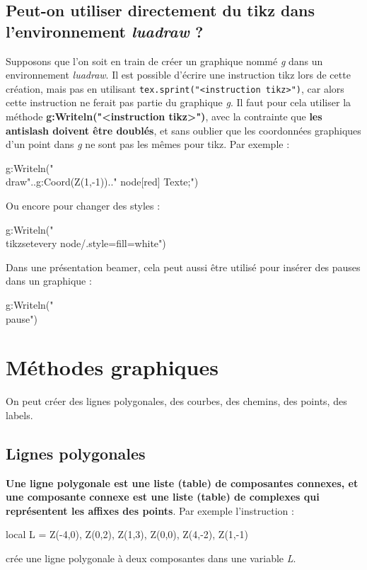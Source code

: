 \documentclass[%
10pt,%
a4paper,%
french,%
]%
{article}%
\begin{document}
\subsection{Peut-on utiliser directement du tikz dans l'environnement \emph{luadraw} ?}

Supposons que l'on soit en train de créer un graphique nommé \emph{g} dans un environnement \emph{luadraw}. Il est possible d'écrire une instruction tikz lors de cette création, mais pas en utilisant \verb|tex.sprint("<instruction tikz>")|, car alors cette instruction ne ferait pas partie du graphique \emph{g}. Il faut pour cela utiliser la méthode \textbf{g:Writeln("<instruction tikz>")}, avec la contrainte que \textbf{les antislash doivent être doublés}, et sans oublier que les coordonnées graphiques d'un point dans \emph{g} ne sont pas les mêmes pour tikz. Par exemple : 
\begin{Luacode}
g:Writeln("\\draw"..g:Coord(Z(1,-1)).." node[red] {Texte};")
\end{Luacode}

Ou encore pour changer des styles :
\begin{Luacode}
g:Writeln("\\tikzset{every node/.style={fill=white}}")
\end{Luacode}

Dans une présentation beamer, cela peut aussi être utilisé pour insérer des pauses dans un graphique :
\begin{Luacode}
g:Writeln("\\pause")
\end{Luacode}  

\section{Méthodes graphiques}\label{objets-graphiques}

On peut créer des lignes polygonales, des courbes, des chemins, des points, des labels.


\subsection{Lignes polygonales}\label{lignes-polygonales}

\textbf{Une ligne polygonale est une liste (table) de composantes connexes, et une composante connexe est une liste (table) de complexes qui représentent les affixes des points}. Par exemple l'instruction :
\begin{Luacode}
local L = { {Z(-4,0), Z(0,2), Z(1,3)}, {Z(0,0), Z(4,-2), Z(1,-1)} }
\end{Luacode}
crée une ligne polygonale à deux composantes dans une variable \emph{L}.
\end{document}
